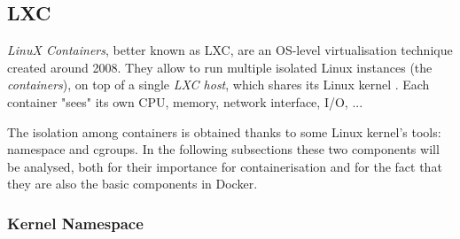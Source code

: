 \documentclass[a4paper,12pt]{article}
\begin{document}

\subsection{LXC}

\textit{LinuX Containers}, better known as LXC, are an OS-level virtualisation
technique created around 2008. They allow to run multiple isolated Linux
instances (the \textit{containers}), on top of a single \textit{LXC host}, which
shares its Linux kernel \cite{wikipedia_LXC}. Each container "sees" its own CPU,
memory, network interface, I/O, ... \par The isolation among containers is
obtained thanks to some Linux kernel's tools: namespace and cgroups. In the
following subsections these two components will be analysed, both for their
importance for containerisation and for the fact that they are also the basic
components in Docker.

\subsubsection{Kernel Namespace}
\end{document}
